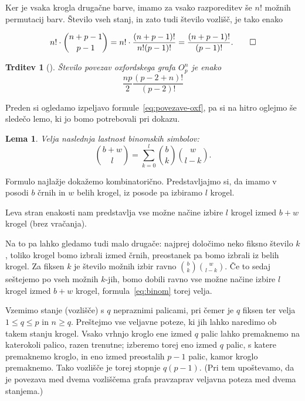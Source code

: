 \documentclass[12pt,a4paper]{amsart}
\theoremstyle{definition} %
\theoremstyle{plain} %
\newtheorem{lema}[definicija]{Lema}
\newtheorem{trditev}[definicija]{Trditev}
\begin{document}
    Ker je vsaka krogla drugačne barve, imamo za vsako razporeditev še $n!$ možnih permutacij barv. Število vseh stanj, in zato tudi število vozlišč, je tako enako
    
    \[ n! \cdot {n+p-1 \choose p-1} = n! \cdot \frac{(n+p-1)!}{n!(p-1)!} = \frac{(n+p-1)!}{(p-1)!}. \qedhere\] 
\endproof

\begin{trditev}[{\cite[Exercise~7.4.]{bib:tohmyths}}]
    Število povezav oxfordskega grafa $O^n_p$ je enako
    \begin{equation}
        \label{eq:povezave-oxf}
        \frac{np}{2} \frac{(p-2+n)!}{(p-2)!}
    \end{equation}
    \label{trd:povezave-oxf}
\end{trditev}
Preden si ogledamo izpeljavo formule~\eqref{eq:povezave-oxf}, pa si na hitro oglejmo še sledečo lemo, ki jo bomo potrebovali pri dokazu.

\begin{lema}
    Velja naslednja lastnost binomskih simbolov:
    \begin{equation}
        \label{eq:binom}
        {b+w \choose l} = \sum_{k=0}^{l}{b \choose k}{w \choose l-k}.
    \end{equation}
\end{lema}

\proof
    Formulo najlažje dokažemo kombinatorično. Predstavljajmo si, da imamo v posodi $b$ črnih in $w$ belih krogel, iz posode pa izbiramo $l$ krogel.
    
    Leva stran enakosti nam predstavlja vse možne načine izbire $l$ krogel izmed $b+w$ krogel (brez vračanja). 
    
    Na to pa lahko gledamo tudi malo drugače: najprej določimo neko fiksno število $k$, toliko krogel bomo izbrali izmed črnih, preostanek pa bomo izbrali iz belih krogel. Za fiksen $k$ je število možnih izbir ravno ${b \choose k}{w \choose l-k}$. Če to sedaj seštejemo po vseh možnih $k$-jih, bomo dobili ravno vse možne načine izbire $l$ krogel izmed $b+w$ krogel, formula~\eqref{eq:binom} torej velja.
\endproof

    Vzemimo stanje (vozlišče) s $q$ nepraznimi palicami, pri čemer je $q$ fiksen ter velja $1 \leq q \leq p$ in $n \geq q$. Preštejmo vse veljavne poteze, ki jih lahko naredimo ob takem stanju krogel. Vsako vrhnjo kroglo ene izmed $q$ palic lahko premaknemo na katerokoli palico, razen trenutne; izberemo torej eno izmed $q$ palic, s katere premaknemo kroglo, in eno izmed preostalih $p-1$ palic, kamor kroglo premaknemo. Tako vozlišče je torej stopnje $q(p-1)$. (Pri tem upoštevamo, da je povezava med dvema vozliščema grafa pravzaprav veljavna poteza med dvema stanjema.)
    
\end{document}
